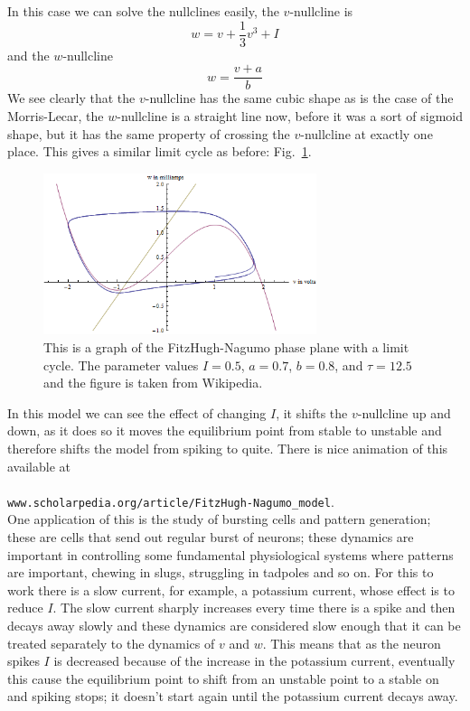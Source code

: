 \documentclass[11pt,a4paper]{scrartcl}
\begin{document}
In this case we can solve the nullclines easily, the $v$-nullcline is
\begin{equation}
w=v+\frac{1}{3}v^3+I
\end{equation}
and the $w$-nullcline
\begin{equation}
w=\frac{v+a}{b}
\end{equation}
We see clearly that the $v$-nullcline has the same cubic shape as is
the case of the Morris-Lecar, the $w$-nullcline is a straight line
now, before it was a sort of sigmoid shape, but it has the same
property of crossing the $v$-nullcline at exactly one place. This gives a similar limit cycle as before: Fig.~\ref{FHN_phase}.



\begin{figure}
\begin{center}
\includegraphics[width=8cm]{FHN_phase.png}
\end{center}
\caption{This is a graph of the FitzHugh-Nagumo phase plane with a limit cycle. The parameter values $I=0.5$, $a=0.7$, $b=0.8$, and $\tau=12.5$ and the figure is taken from Wikipedia.\label{FHN_phase}}
\end{figure}

In this model we can see the effect of changing $I$, it shifts the
$v$-nullcline up and down, as it does so it moves the equilibrium
point from stable to unstable and therefore shifts the model from
spiking to quite. There is nice animation of this available at\\
\\
\texttt{www.scholarpedia.org/article/FitzHugh-Nagumo\_model}. \\

One application of this is the study of bursting cells and pattern
generation; these are cells that send out regular burst of neurons;
these dynamics are important in controlling some fundamental
physiological systems where patterns are important, chewing in slugs,
struggling in tadpoles and so on. For this to work there is a slow
current, for example, a potassium current, whose effect is to reduce
$I$. The slow current sharply increases every time there is a spike and
then decays away slowly and these dynamics are considered slow enough
that it can be treated separately to the dynamics of $v$ and $w$. This
means that as the neuron spikes $I$ is decreased because of the
increase in the potassium current, eventually this cause the
equilibrium point to shift from an unstable point to a stable on and
spiking stops; it doesn't start again until the potassium current decays away.
\end{document}
